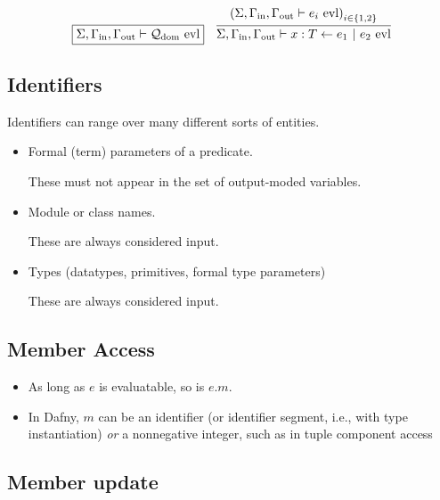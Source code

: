 \documentclass[11pt]{article}
\begin{document}
\begin{figure}
  \[
    \begin{array}{c}
      \begin{array}{cc}
        \fbox{\(\Sigma,\Gamma_{\text{in}},\Gamma_{\text{out}} \vdash \mathcal{Q}_\text{dom}\ \text{evl}\)}
        & \infer{
          \Sigma,\Gamma_{\text{in}},\Gamma_{\text{out}} \vdash x:T \leftarrow e_1\ |\ e_2\ \text{evl}
        }{
          \left(\Sigma,\Gamma_{\text{in}},\Gamma_{\text{out}} \vdash e_i\ \text{evl}\right)_{i \in \{1,2\}}
        }
      \end{array}
    \end{array}
  \]
  \label{fig:rules-evaluatable-aux}
\end{figure}

\subsection{Identifiers}
\label{sec:orgb29c0e7}

Identifiers can range over many different sorts of entities.
\begin{itemize}
\item Formal (term) parameters of a predicate.

These must not appear in the set of output-moded variables.
\item Module or class names.

These are always considered input.
\item Types (datatypes, primitives, formal type parameters)

These are always considered input.
\end{itemize}

\subsection{Member Access}
\label{sec:orgb54ab02}

\begin{itemize}
\item As long as \(e\) is evaluatable, so is \(e.m\).

\item In Dafny, \(m\) can be an identifier (or identifier segment, i.e., with type
instantiation) \emph{or} a nonnegative integer, such as in tuple component access
\end{itemize}


\subsection{Member update}
\label{sec:orgd34ce3f}
\end{document}
